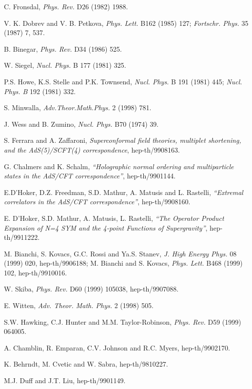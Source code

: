 \documentclass[a4paper,12pt]{article}
\begin{document}
\begin{thebibliography}{99}
 C. Fronsdal, {\it Phys. Rev.}
D26 (1982) 1988. 

V. K. Dobrev and V. B. Petkova, {\it Phys. Lett.} B162 (1985) 
127; {\it Fortschr. Phys.} 35 (1987) 7, 537. 

 B. Binegar, {\it Phys. Rev.} D34 (1986) 525.

 W. Siegel, {\it Nucl. Phys.} B 177 (1981) 325. 

 P.S. Howe, K.S. Stelle and P.K. Townsend, {\it Nucl.
Phys.} B 191 (1981) 445; {\it Nucl. Phys. B} 192 (1981) 332. 



 S. Minwalla, {\it Adv.Theor.Math.Phys.} 2 (1998) 781. 
 

 J. Wess and B. Zumino, {\it  Nucl. Phys.} 
B70 (1974) 39. 

 S. Ferrara and A. Zaffaroni, 
{\it Superconformal field theories, multiplet shortening, and the  
AdS(5)/SCFT(4) correspondence}, hep-th/9908163. 

G. Chalmers and K. Schalm, {\sl ``Holographic normal ordering and 
multiparticle states in the AdS/CFT correspondence''}, 
hep-th/9901144. 

E.D'Hoker, D.Z. Freedman, S.D. Mathur, A. Matusis and L. Rastelli, 
{\sl ``Extremal correlators in the AdS/CFT correspondence''}, 
hep-th/9908160. 

E. D'Hoker, S.D. Mathur, A. Matusis, L. Rastelli, {\sl ``The 
Operator Product Expansion of N=4 SYM and the 4-point Functions 
 of Supergravity''}, hep-th/9911222.

M. Bianchi, S. Kovacs, G.C. Rossi and Ya.S. Stanev, {\it J. High 
Energy Phys.} 08 (1999) 020, hep-th/9906188; M. Bianchi and S. 
Kovacs, {\it Phys. Lett.} B468 (1999) 102, hep-th/9910016. 

W. Skiba, {\it Phys. Rev.} D60 (1999) 105038, hep-th/9907088. 

 E. Witten, {\it Adv. Theor. Math. Phys.} 2 (1998) 
505.

 S.W. Hawking, C.J. Hunter and M.M. Taylor-Robinson, 
{\it Phys. Rev.} D59 (1999) 064005.

 A. Chamblin, R. Emparan, C.V. Johnson and R.C. Myers, hep-th/9902170. 

 K. Behrndt, M. Cvetic and W. Sabra, hep-th/9810227.

 M.J. Duff and J.T. Liu, hep-th/9901149. 



\end{thebibliography}
\end{document}

